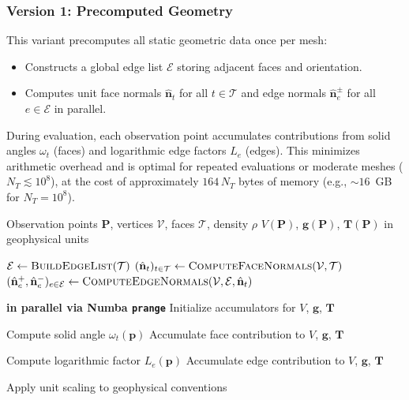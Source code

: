 \documentclass{seg}
\begin{document}
\subsubsection*{Version 1: Precomputed Geometry}
This variant precomputes all static geometric data once per mesh:
\begin{itemize}
    \item Constructs a global edge list $\mathcal{E}$ storing adjacent faces and orientation.
    \item Computes unit face normals $\hat{\mathbf{n}}_t$ for all $t \in \mathcal{T}$ and edge normals $\hat{\mathbf{n}}_{e}^{\pm}$ for all $e \in \mathcal{E}$ in parallel.
\end{itemize}
During evaluation, each observation point accumulates contributions from solid angles $\omega_t$ (faces) and logarithmic edge factors $L_e$ (edges). This minimizes arithmetic overhead and is optimal for repeated evaluations or moderate meshes ($N_T \lesssim 10^8$), at the cost of approximately $164\,N_T$ bytes of memory (e.g., $\sim\!16$~GB for $N_T = 10^8$).

\begin{algorithm}[H]
\small
\caption{WerSch\_numba\_v1 (Precomputed Geometry)}
\begin{algorithmic}[1]
\Require Observation points $\mathbf{P}$, vertices $\mathcal{V}$, faces $\mathcal{T}$, density $\rho$
\Ensure $V(\mathbf{P})$, $\mathbf{g}(\mathbf{P})$, $\mathbf{T}(\mathbf{P})$ in geophysical units

\State $\mathcal{E} \gets \Call{BuildEdgeList}{\mathcal{T}}$
\State $(\hat{\mathbf{n}}_t)_{t \in \mathcal{T}} \gets \Call{ComputeFaceNormals}{\mathcal{V}, \mathcal{T}}$
\State $(\hat{\mathbf{n}}_{e}^{+}, \hat{\mathbf{n}}_{e}^{-})_{e \in \mathcal{E}} \gets \Call{ComputeEdgeNormals}{\mathcal{V}, \mathcal{E}, \hat{\mathbf{n}}_t}$

 \textbf{in parallel via Numba \texttt{prange}}
    \State Initialize accumulators for $V$, $\mathbf{g}$, $\mathbf{T}$
    
        \State Compute solid angle $\omega_t(\mathbf{p})$
        \State Accumulate face contribution to $V$, $\mathbf{g}$, $\mathbf{T}$
    \EndFor
    
        \State Compute logarithmic factor $L_e(\mathbf{p})$
        \State Accumulate edge contribution to $V$, $\mathbf{g}$, $\mathbf{T}$
    \EndFor
    
    \State Apply unit scaling to geophysical conventions
\EndFor
\end{algorithmic}
\end{algorithm}
\end{document}
